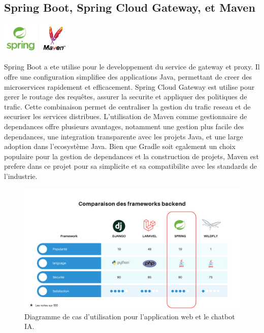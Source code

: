 \documentclass[a4paper, 11pt, openany]{report}
\begin{document}
\subsection{Spring Boot, Spring Cloud Gateway, et Maven}
\begin{center}
\includegraphics[height=1.5cm]{assets/images/spring.png}
\includegraphics[height=1.5cm]{assets/images/maven.png}
\end{center}

Spring Boot a ete utilise pour le developpement du service de gateway et proxy. Il offre une configuration simplifiee des applications Java, permettant de creer des microservices rapidement et efficacement. Spring Cloud Gateway est utilise pour gerer le routage des requêtes, assurer la securite et appliquer des politiques de trafic. Cette combinaison permet de centraliser la gestion du trafic reseau et de securiser les services distribues. L'utilisation de Maven comme gestionnaire de dependances offre plusieurs avantages, notamment une gestion plus facile des dependances, une integration transparente avec les projets Java, et une large adoption dans l'ecosystème Java. Bien que Gradle soit egalement un choix populaire pour la gestion de dependances et la construction de projets, Maven est prefere dans ce projet pour sa simplicite et sa compatibilite avec les standards de l'industrie.



\begin{figure}[h!]
\centering
\includegraphics[width=\textwidth]{assets/images/bechmark.png}
\caption{Diagramme de cas d'utilisation pour l'application web et le chatbot IA.}
\label{fig:bechmark}
\end{figure}
\end{document}
